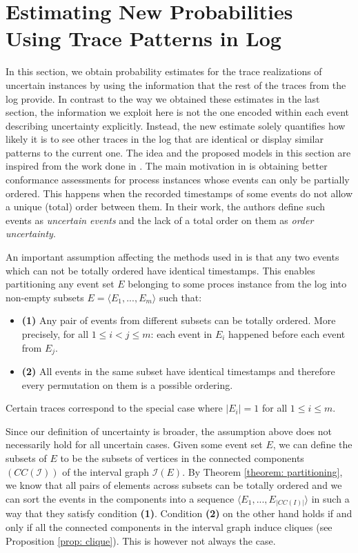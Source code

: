 %
%
%
%
%
%
\newpage
\section{Estimating New Probabilities Using Trace Patterns in Log }
In this section, we obtain probability estimates for the trace realizations of uncertain instances by using the information that the rest of the traces from the log provide.
In contrast to the way we obtained these estimates in the last section, the information we exploit here is not the one encoded within each event describing uncertainty explicitly. 
Instead, the new estimate solely quantifies how likely it is to see other traces in the log that are identical or display similar patterns to the current one.
The idea and the proposed models in this section are inspired from the work done in \cite{por}.
The main motivation in \cite{por} is obtaining better conformance assessments for process instances whose events can only be partially ordered.
This happens when the recorded timestamps of some events do not allow a unique (total) order between them.
In their work, the authors define such events as \textit{uncertain events} and the lack of a total order on them as \textit{order uncertainty}.

An important assumption affecting the methods used in \cite{por} is that any two events which can not be totally ordered have identical timestamps.
This enables partitioning any event set $E$ belonging to some proces instance from the log into non-empty subsets $E=\langle E_1,...,E_m \rangle $ such that:
\begin{itemize}
\item \textbf{(1)} Any pair of events from different subsets can be totally ordered.
More precisely, for all $1 \leq i < j \leq m$: each event in $E_i$ happened before each event from $E_j$.  
\item \textbf{(2)} All events in the same subset have identical timestamps and therefore every permutation on them is a possible ordering.
\end{itemize}
Certain traces correspond to the special case where $|E_i| = 1$ for all $1 \leq i \leq m$.

Since our definition of uncertainty is broader, the assumption above does not necessarily hold for all uncertain cases.
Given some event set $E$, we can define the subsets of $E$ to be the subsets of vertices in the connected components $(CC(\mathcal{I}))$ of the interval graph $\mathcal{I}(E)$.
By Theorem \ref{theorem: partitioning}, we know that all pairs of elements across subsets can be totally ordered and we can sort the events in the components into a sequence $\langle E_1,...,E_{|CC(I)|}\rangle$ in such a way that they satisfy condition \textbf{(1)}.
Condition \textbf{(2)} on the other hand holds if and only if all the connected components in the interval graph induce cliques (see Proposition \ref{prop: clique}).
This is however not always the case.

